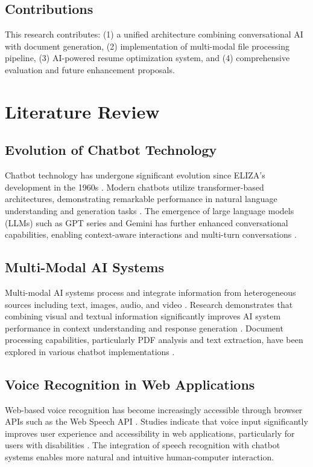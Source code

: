 \documentclass[conference]{IEEEtran}
\begin{document}
\subsection{Contributions}
This research contributes: (1) a unified architecture combining conversational AI with document generation, (2) implementation of multi-modal file processing pipeline, (3) AI-powered resume optimization system, and (4) comprehensive evaluation and future enhancement proposals.

\section{Literature Review}

\subsection{Evolution of Chatbot Technology}
Chatbot technology has undergone significant evolution since ELIZA's development in the 1960s \cite{weizenbaum1966}. Modern chatbots utilize transformer-based architectures, demonstrating remarkable performance in natural language understanding and generation tasks \cite{vaswani2017}. The emergence of large language models (LLMs) such as GPT series and Gemini has further enhanced conversational capabilities, enabling context-aware interactions and multi-turn conversations \cite{thoppilan2022}.

\subsection{Multi-Modal AI Systems}
Multi-modal AI systems process and integrate information from heterogeneous sources including text, images, audio, and video \cite{baltrusaitis2019}. Research demonstrates that combining visual and textual information significantly improves AI system performance in context understanding and response generation \cite{lu2019}. Document processing capabilities, particularly PDF analysis and text extraction, have been explored in various chatbot implementations \cite{devlin2018}.

\subsection{Voice Recognition in Web Applications}
Web-based voice recognition has become increasingly accessible through browser APIs such as the Web Speech API \cite{w3c2023}. Studies indicate that voice input significantly improves user experience and accessibility in web applications, particularly for users with disabilities \cite{pradhan2018}. The integration of speech recognition with chatbot systems enables more natural and intuitive human-computer interaction.
\end{document}
